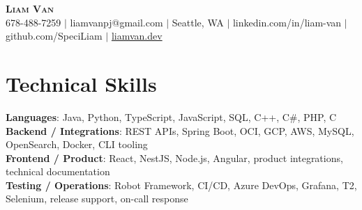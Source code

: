 \documentclass[letterpaper,11pt]{article}
\begin{document}

%
\begin{center}
    \textbf{\Huge \scshape Liam Van} \\ \vspace{1pt}
    \small 678-488-7259 $|$ \small {liamvanpj@gmail.com} $|$ Seattle, WA
 {{$|$ linkedin.com/in/liam-van} {$|$ github.com/SpeciLiam} {$|$ \href{https://liamvan.dev}{liamvan.dev}}}

\end{center}

\section{Technical Skills}
 \begin{itemize}[leftmargin=0.15in, label={}]
    \small{\item{
     \textbf{Languages}{: Java, Python, TypeScript, JavaScript, SQL, C++, C\#, PHP, C} \\
     \textbf{Backend / Integrations}{: REST APIs, Spring Boot, OCI, GCP, AWS, MySQL, OpenSearch, Docker, CLI tooling} \\
     \textbf{Frontend / Product}{: React, NestJS, Node.js, Angular, product integrations, technical documentation} \\
     \textbf{Testing / Operations}{: Robot Framework, CI/CD, Azure DevOps, Grafana, T2, Selenium, release support, on-call response} \\
    }}
 \end{itemize}
%

\end{document}
